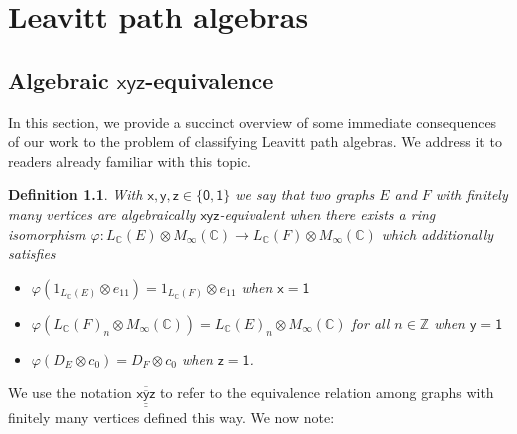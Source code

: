 \documentclass[12pt]{amsbook}%
\renewcommand{\phi}{\varphi}
\theoremstyle{defin}
\newtheorem{defin}[theor]{Definition}
\theoremstyle{remark}
\numberwithin{equation}{chapter}
\numberwithin{theor}{section}
\renewcommand{\thetable}{\arabic{chapter}.\arabic{table}}
\renewcommand{\thefigure}{\arabic{chapter}.\arabic{figure}}
\newcommand{\CC}{\mathbb{C}}
\newcommand{\ZZ}{\mathbb{Z}}
\newcommand{\xyz}[1]{\mbox{$\mathsf{#1}$}}
\newcommand{\xyzrel}[1]{\mbox{$\overline{\underline{\mathsf{ #1}}}$}}
\newcommand{\xyzLPArel}[1]{\mbox{$\overline{\overline{\underline{\underline{\mathsf{ #1}}}}}$}}
\begin{document}
\appendix

\renewcommand{\thetable}{A.\arabic{table}}   


\chapter{Leavitt path algebras}\label{LPA}
\section{Algebraic \xyz{xyz}-equivalence}

In this section, we provide a succinct overview of some immediate consequences of our work to the problem of classifying Leavitt path algebras. We address it to readers already familiar with this topic.

\begin{defin}\label{xyzLPAdef}
With $\xyz{x}, \xyz{y}, \xyz{z} \in \{ \xyz{0}, \xyz{1}\}$ we 
say that two graphs $E$ and $F$ with finitely many vertices are  \emph{algebraically \xyz{xyz}-equivalent} when there exists a ring isomorphism $\phi \colon L_{\CC}(E) \otimes M_\infty({\CC})\to L_{\CC}(F)\otimes M_\infty({\CC})$ which additionally satisfies 
\begin{itemize}
\item $\phi ( 1_{ L_{\CC}(E)} \otimes e_{11} ) = 1_{ L_{\CC}(F)} \otimes e_{11}$ when $\xyz{x} = \xyz{1}$

\item $\phi(   L_{\CC}(F)_n \otimes  M_\infty({\CC})) = L_{\CC}(E)_n \otimes  M_\infty({\CC})$ for all $n\in\ZZ$ when $\xyz{y} = \xyz{1}$

\item $\phi ( {D}_E \otimes c_0 ) = {D}_F \otimes c_0$ when $\xyz{z} = \xyz{1}$.
\end{itemize}
\end{defin}

We use the notation $\xyzLPArel{xyz}$ to refer to the equivalence relation among graphs with finitely many vertices defined this way. We now note:
\end{document}
